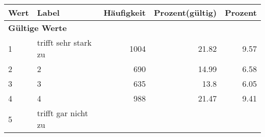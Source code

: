      \begin{longtable}{lXrrr}
     \toprule
     \textbf{Wert} & \textbf{Label} & \textbf{Häufigkeit} & \textbf{Prozent(gültig)} & \textbf{Prozent} \\
     \endhead
     \midrule
     \multicolumn{5}{l}{\textbf{Gültige Werte}}\\

     1 &
     \multicolumn{1}{X}{ trifft sehr stark zu   } &


       \num{1004} &
       \num[round-mode=places,round-precision=2]{21.82} &
         \num[round-mode=places,round-precision=2]{9.57} \\

     2 &
     \multicolumn{1}{X}{ 2   } &


       \num{690} &
       \num[round-mode=places,round-precision=2]{14.99} &
         \num[round-mode=places,round-precision=2]{6.58} \\

     3 &
     \multicolumn{1}{X}{ 3   } &


       \num{635} &
       \num[round-mode=places,round-precision=2]{13.8} &
         \num[round-mode=places,round-precision=2]{6.05} \\

     4 &
     \multicolumn{1}{X}{ 4   } &


       \num{988} &
       \num[round-mode=places,round-precision=2]{21.47} &
         \num[round-mode=places,round-precision=2]{9.41} \\

     5 &
     \multicolumn{1}{X}{ trifft gar nicht zu   } &



\end{longtable}
